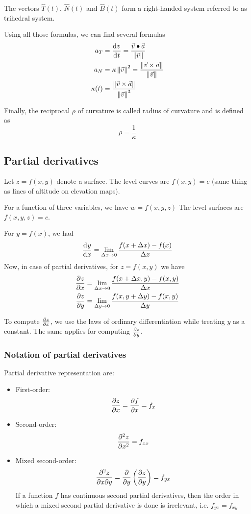 \documentclass[10pt, twocolumn]{article}
\theoremstyle{remark}
\begin{document}
The vectors \(\hat{T}(t)\), \(\hat{N}(t)\) and \(\hat{B}(t)\) form a right-handed system referred to as trihedral system.

Using all those formulas, we can find several formulas
\begin{align*}
  a_T       & = \frac{\mathrm{d}^{} v}{\mathrm{d}^{} t} = \frac{\vec{v} \bullet \vec{a}}{\left\| \vec{v} \right\|}          \\
  a_N       & = \kappa \left\| \vec{v} \right\|^2 = \frac{\left\| \vec{v} \times \vec{a} \right\|}{\left\| \vec{v} \right\|} \\
  \kappa(t) & = \frac{\left\| \vec{v} \times \vec{a} \right\|}{\left\| \vec{v} \right\|^3 }
\end{align*}

Finally, the reciprocal \(\rho\) of curvature is called radius of curvature and is defined as
\[
  \rho = \frac{1}{\kappa}
\]

\subsection{Partial derivatives}
Let \(z = f(x, y)\) denote a surface.
The level curves are \(f(x, y) = c\) (same thing as lines of altitude on elevation maps).

For a function of three variables, we have \(w = f(x, y, z)\)
The level surfaces are \(f(x, y, z) = c\).

For \(y = f(x)\), we had
\[
  \frac{\mathrm{d}^{} y}{\mathrm{d}^{} x} = \lim_{\Delta x \to 0}{\frac{f(x + \Delta x) - f(x)}{\Delta x}}
\]
Now, in case of partial derivatives, for \(z = f(x, y)\) we have
\begin{align*}
  \frac{\partial z}{\partial x} & = \lim_{\Delta x \to 0}{\frac{f(x + \Delta x, y) - f(x, y)}{\Delta x}} \\
  \frac{\partial z}{\partial y} & = \lim_{\Delta y \to 0}{\frac{f(x, y + \Delta y) - f(x, y)}{\Delta y}}
\end{align*}

To compute \(\frac{\partial z}{\partial x}\), we use the laws of ordinary differentiation while treating \(y\) as a constant.
The same applies for computing \(\frac{\partial z}{\partial y}\).

\subsubsection*{Notation of partial derivatives}
Partial derivative representation are:
\begin{itemize}
  \item First-order:
        \[
          \frac{\partial z}{\partial x} = \frac{\partial f}{\partial x} = f_x
        \]
  \item Second-order:
        \[
          \frac{\partial^{2} z}{\partial x^{2}} = f_{xx}
        \]
  \item Mixed second-order:
        \[
          \frac{\partial^2 z}{\partial x \partial y} = \frac{\partial }{\partial y} \left( \frac{\partial z}{\partial y} \right) = f_{yx}
        \]
        If a function \(f\) has continuous second partial derivatives, then the order in which a mixed second partial derivative is done is irrelevant, i.e. \(f_{yx} = f_{xy}\)
\end{itemize}
\end{document}
